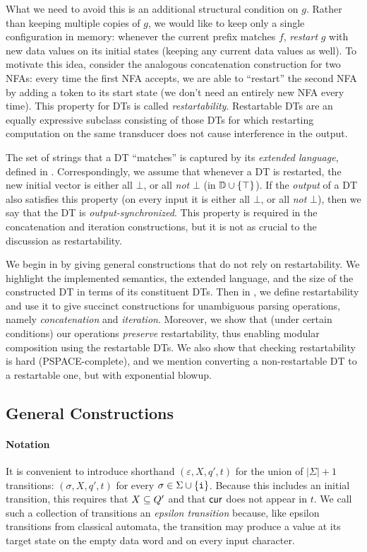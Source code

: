 What we need to avoid this is an additional structural condition on $g$. Rather than keeping multiple copies of $g$, we would like to keep only a single configuration in memory: whenever the current prefix matches $f$, \emph{restart} $g$ with new data values on its initial states (keeping any current data values as well).
To motivate this idea, consider the analogous concatenation construction for two NFAs: every time the first NFA accepts, we are able to ``restart'' the second NFA by adding a token to its start state (we don't need an entirely new NFA every time).
This property for DTs is called \emph{restartability}.
Restartable DTs are an equally expressive subclass
consisting of those DTs for which restarting computation on the same transducer does not cause interference in the output.

The set of strings that a DT ``matches'' is captured by its \emph{extended language}, defined in . Correspondingly, we assume that whenever a DT is restarted, the new initial vector is either all $\bot$, or all \emph{not} $\bot$ (in $\mathbb{D} \cup \{\top\}$). If the \emph{output} of a DT also satisfies this property (on every input it is either all $\bot$, or all \emph{not} $\bot$), then we say that the DT is \emph{output-synchronized}. This property is required in the concatenation and iteration constructions, but it is not as crucial to the discussion as restartability.

We begin in  by giving general constructions that do not rely on restartability. We highlight the implemented semantics, the extended language, and the size of the constructed DT in terms of its constituent DTs.
Then in , we define restartability and use it to give succinct constructions for unambiguous parsing operations, namely \emph{concatenation} and \emph{iteration}.
Moreover, we show that (under certain conditions) our operations \emph{preserve} restartability, thus enabling modular composition using the restartable DTs. We also show that checking restartability is hard (PSPACE-complete), and we mention converting a non-restartable DT to a restartable one, but with exponential blowup.

\subsection{General Constructions}
\label{dt:subsec:constructions-general}

\paragraph*{Notation}
It is convenient to introduce shorthand $(\varepsilon, X, q', t)$ for the union of $|\Sigma| + 1$ transitions: $(\sigma, X, q', t)$ for every $\sigma \in \Sigma \cup \{{\texttt{i}}\}$. Because this includes an initial transition, this requires that $X \subseteq Q'$ and that $\mathsf{cur}$ does not appear in $t$. We call such a collection of transitions an \emph{epsilon transition} because, like epsilon transitions from classical automata, the transition may produce a value at its target state on the empty data word and on every input character.

